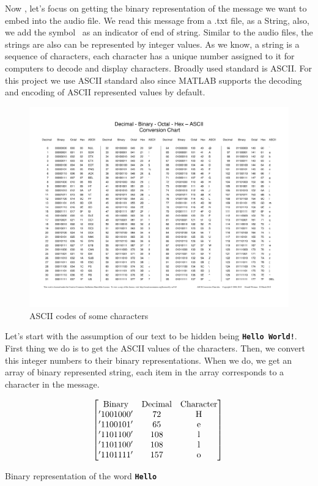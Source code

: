 \documentclass[twocolumns]{IEEEtran}
\begin{document}
	Now , let's focus on getting the binary representation of the message we want to embed into the audio file. We read this message from a .txt file, as a String, also, we add the symbol \ as an indicator of end of string. Similar to the audio files, the strings are also can be represented by integer values. As we know, a string is a sequence of characters, each character has a unique number assigned to it for computers to decode and display characters. Broadly used standard is ASCII. For this project we use ASCII standard also since MATLAB supports the decoding and encoding of ASCII represented values by default.
	\begin{figure}[h]
		\centering
		\includegraphics{ascii.pdf}
		\caption{ASCII codes of some characters}
	\end{figure}

	Let's start with the assumption of our text to be hidden being 
	\textbf{\texttt{Hello World!}}. First thing we do is to get the ASCII values of the characters. Then, we convert this integer numbers to their binary representations. When we do, we get an array of binary represented string, each item in the array corresponds to a character in the message.
	
	\begin{equation}
		\begin{bmatrix}
			\text{Binary} & \text{Decimal} & \text{Character} \\
			'1001000' & 72 & \text{H} \\
			'1100101' & 65 & \text{e}\\
			'1101100' & 108 & \text{l}\\
			'1101100' & 108 & \text{l}\\
			'1101111' & 157 & \text{o}\\
		\end{bmatrix} \\ \\		
	\end{equation}
	\begin{center}
		Binary representation of the word \textbf{\texttt{Hello}}
	\end{center}
	
\end{document}
